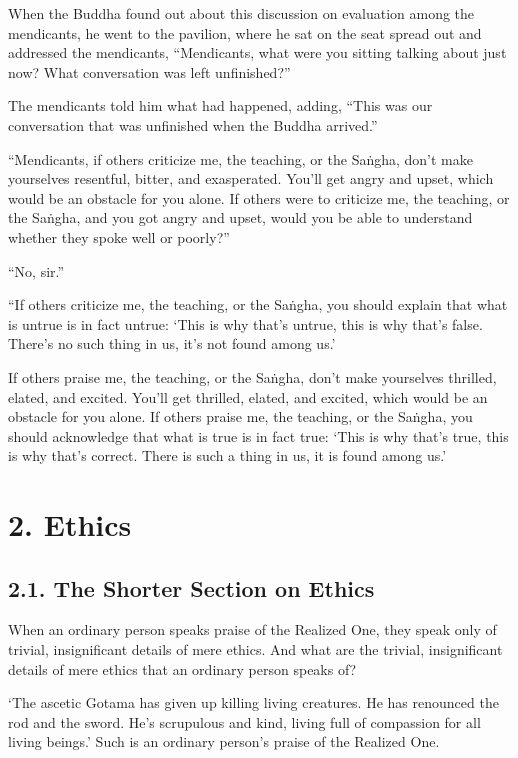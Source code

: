 \documentclass[12pt,openany]{book}%
\begin{document}
When the Buddha found out about this discussion on evaluation among the mendicants, he went to the pavilion, where he sat on the seat spread out and addressed the mendicants, “Mendicants, what were you sitting talking about just now? What conversation was left unfinished?” 

The mendicants told him what had happened, adding, “This was our conversation that was unfinished when the Buddha arrived.” 

“Mendicants, if others criticize me, the teaching, or the \textsanskrit{Saṅgha}, don’t make yourselves resentful, bitter, and exasperated. You’ll get angry and upset, which would be an obstacle for you alone. If others were to criticize me, the teaching, or the \textsanskrit{Saṅgha}, and you got angry and upset, would you be able to understand whether they spoke well or poorly?” 

“No, sir.” 

“If others criticize me, the teaching, or the \textsanskrit{Saṅgha}, you should explain that what is untrue is in fact untrue: ‘This is why that’s untrue, this is why that’s false. There’s no such thing in us, it’s not found among us.’ 

If others praise me, the teaching, or the \textsanskrit{Saṅgha}, don’t make yourselves thrilled, elated, and excited. You’ll get thrilled, elated, and excited, which would be an obstacle for you alone. If others praise me, the teaching, or the \textsanskrit{Saṅgha}, you should acknowledge that what is true is in fact true: ‘This is why that’s true, this is why that’s correct. There is such a thing in us, it is found among us.’ 

\section*{2. Ethics }

\subsection*{2.1. The Shorter Section on Ethics }

When an ordinary person speaks praise of the Realized One, they speak only of trivial, insignificant details of mere ethics. And what are the trivial, insignificant details of mere ethics that an ordinary person speaks of? 

‘The ascetic Gotama has given up killing living creatures. He has renounced the rod and the sword. He’s scrupulous and kind, living full of compassion for all living beings.’ Such is an ordinary person’s praise of the Realized One. 
\end{document}
